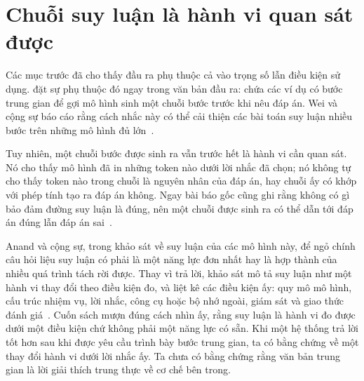 \section{Chuỗi suy luận là hành vi quan sát được}
\label{sec:ch02-chuoi-suy-luan}

%
Các mục trước đã cho thấy đầu ra phụ thuộc cả vào trọng số lẫn điều kiện sử
dụng.  đặt sự phụ thuộc đó ngay trong
văn bản đầu ra:  chứa các ví dụ có bước trung gian để gợi mô hình sinh
một chuỗi bước trước khi nêu đáp án. Wei và cộng sự báo cáo rằng cách nhắc
này có thể cải thiện các bài toán suy luận nhiều bước trên những mô hình đủ
lớn~\autocite{p06cot}.

Tuy nhiên, một chuỗi bước được sinh ra vẫn trước hết là hành vi cần quan sát.
Nó cho thấy mô hình đã in những token nào dưới lời nhắc đã chọn;
nó không tự cho thấy token nào trong chuỗi là nguyên nhân của đáp án, hay
chuỗi ấy có khớp với phép tính tạo ra đáp án không. Ngay bài báo gốc cũng ghi rằng không có gì bảo đảm đường suy luận là đúng,
nên một chuỗi được sinh ra có thể dẫn tới đáp án đúng lẫn đáp án
sai~\autocite{p06cot}.

Anand và cộng sự, trong khảo sát về suy luận của các mô hình này, để ngỏ
chính câu hỏi liệu suy luận có phải là một năng lực đơn nhất hay là hợp thành
của nhiều quá trình tách rời được. Thay vì trả lời, khảo sát mô tả suy luận
như một hành vi thay đổi theo điều kiện đo, và liệt kê các điều kiện ấy: quy
mô mô hình, cấu trúc nhiệm vụ, lời nhắc, công cụ hoặc bộ nhớ ngoài, giám sát
và giao thức đánh giá~\autocite{p08periodic}. Cuốn sách mượn đúng cách nhìn
ấy, rằng suy luận là hành vi đo được dưới một điều kiện chứ không phải một
năng lực có sẵn. Khi một hệ thống trả lời tốt hơn sau khi được yêu cầu trình
bày bước trung gian, ta có bằng chứng về một thay đổi hành vi dưới lời nhắc
ấy. Ta chưa có bằng chứng rằng văn bản trung gian là lời giải thích trung thực
về cơ chế bên trong.

